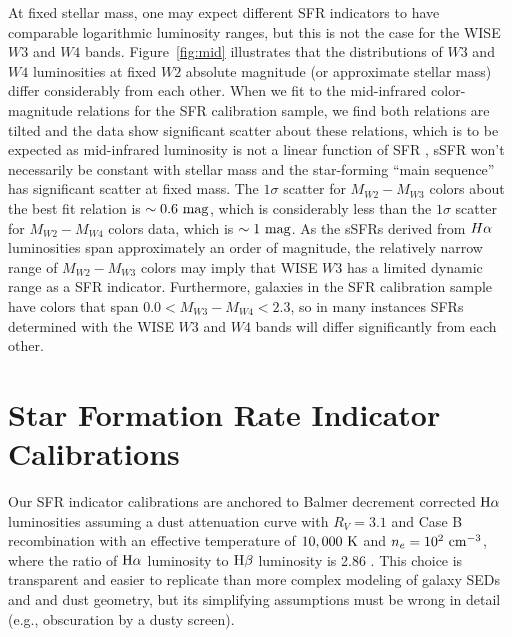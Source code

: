 \documentclass[preprint]{aastex61}
\begin{document}
At fixed stellar mass, one may expect different SFR indicators to have comparable logarithmic luminosity ranges, but this is not the case for the WISE $W3$ and $W4$ bands. Figure~\ref{fig:mid} illustrates that the distributions of $W3$ and $W4$ luminosities at fixed $W2$ absolute magnitude (or approximate stellar mass) differ considerably from each other. When we fit to the mid-infrared color-magnitude relations for the SFR calibration sample, we find both relations are tilted and the data show significant scatter about these relations, which is to be expected as mid-infrared luminosity is not a linear function of SFR \citep[e.g.,][]{lee13,cat15}, sSFR won't necessarily be constant with stellar mass and the star-forming ``main sequence'' has significant scatter at fixed mass.  The $1\sigma$ scatter for $M_{W2}-M_{W3}$ colors about the best fit relation is $\sim 0.6~{\rm mag}$, which is considerably less than the $1\sigma$ scatter for $M_{W2}-M_{W4}$ colors data, which is $\sim 1~{\rm mag}$. As the sSFRs derived from $H{\rm \alpha}$ luminosities span approximately an order of magnitude, the relatively narrow range of $M_{W2}-M_{W3}$ colors may imply that WISE $W3$ has a limited dynamic range as a SFR indicator. Furthermore, galaxies in the SFR calibration sample have colors that span $0.0<M_{W3}-M_{W4}<2.3$, so in many instances SFRs determined with the WISE $W3$ and $W4$ bands will differ significantly from each other. 

\begin{figure*}
\caption{WISE mid-infrared color-magnitude diagrams for the sample. Compared to the optical color-magnitude diagram, SFR indicator calibration galaxies are clearly separated from the locus of passive galaxies (located at the bottom right of both panels). While both WISE $W3$ and $W4$ luminosities are used as SFR indicators, the widths of the $M_{W2}-M_{W3}$ and $M_{W2}-M_{W4}$ distributions differ considerably from each other, and this may imply $W3$ has a limited dynamic range as a SFR indicator.}
\label{fig:mid}
\end{figure*}

\section{Star Formation Rate Indicator Calibrations}
\label{sec:calibration}

Our SFR indicator calibrations are anchored to Balmer decrement corrected ${\rm H\alpha}$ luminosities assuming a \citet{fit99} dust attenuation curve with $R_V=3.1$ and Case B recombination with an effective temperature of $10,000~{\rm K}$ and $n_e=10^2~{\rm cm}^{-3}$, where the ratio of ${\rm H\alpha}$ luminosity to ${\rm H\beta}$ luminosity is 2.86 \citep{sto95,dop03}. This choice is transparent and easier to replicate than more complex modeling of galaxy SEDs and and dust geometry, but its simplifying assumptions must be wrong in detail (e.g., obscuration by a dusty screen). 
\end{document}

